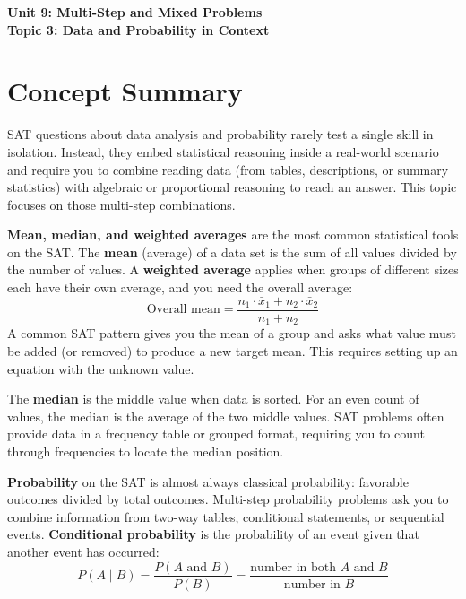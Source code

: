 \documentclass[14pt]{extarticle}
\begin{document}
\raggedright
{}

\begin{center}
    \LARGE \textbf{Unit 9: Multi-Step and Mixed Problems} \\[6pt]
    \Large \textbf{Topic 3: Data and Probability in Context}
\end{center}

\vspace{1em}

\section*{Concept Summary}

SAT questions about data analysis and probability rarely test a single skill in isolation. Instead, they embed statistical reasoning inside a real-world scenario and require you to combine reading data (from tables, descriptions, or summary statistics) with algebraic or proportional reasoning to reach an answer. This topic focuses on those multi-step combinations.

\textbf{Mean, median, and weighted averages} are the most common statistical tools on the SAT. The \textbf{mean} (average) of a data set is the sum of all values divided by the number of values. A \textbf{weighted average} applies when groups of different sizes each have their own average, and you need the overall average:
\[
\text{Overall mean} = \frac{n_1 \cdot \bar{x}_1 + n_2 \cdot \bar{x}_2}{n_1 + n_2}
\]
A common SAT pattern gives you the mean of a group and asks what value must be added (or removed) to produce a new target mean. This requires setting up an equation with the unknown value.

The \textbf{median} is the middle value when data is sorted. For an even count of values, the median is the average of the two middle values. SAT problems often provide data in a frequency table or grouped format, requiring you to count through frequencies to locate the median position.

\textbf{Probability} on the SAT is almost always classical probability: favorable outcomes divided by total outcomes. Multi-step probability problems ask you to combine information from two-way tables, conditional statements, or sequential events. \textbf{Conditional probability} is the probability of an event given that another event has occurred:
\[
P(A \mid B) = \frac{P(A \text{ and } B)}{P(B)} = \frac{\text{number in both } A \text{ and } B}{\text{number in } B}
\]
\end{document}

